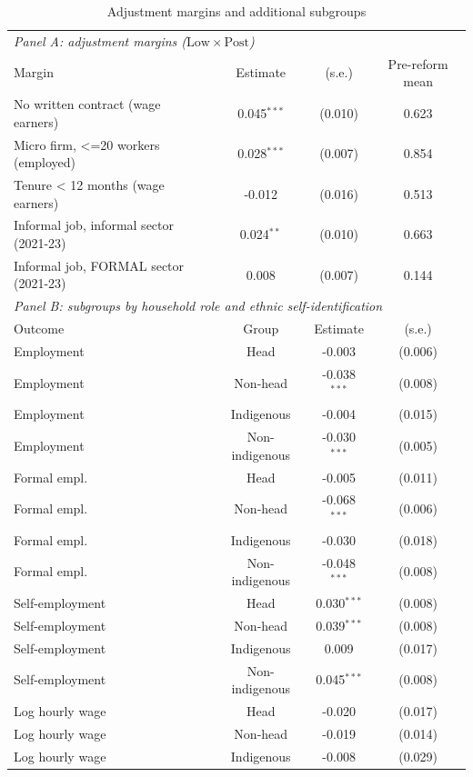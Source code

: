\begin{table}[!tbp]\centering
\caption{Adjustment margins and additional subgroups}\label{tab:margins}
\begin{threeparttable}
\footnotesize
\begin{tabular}{lccc}
\toprule
\multicolumn{4}{l}{\emph{Panel A: adjustment margins ($\mathrm{Low}\times\mathrm{Post}$)}}\\
Margin & Estimate & (s.e.) & Pre-reform mean \\
\midrule
No written contract (wage earners) & 0.045$^{***}$ & (0.010) & 0.623 \\
Micro firm, <=20 workers (employed) & 0.028$^{***}$ & (0.007) & 0.854 \\
Tenure < 12 months (wage earners) & -0.012 & (0.016) & 0.513 \\
Informal job, informal sector (2021-23) & 0.024$^{**}$ & (0.010) & 0.663 \\
Informal job, FORMAL sector (2021-23) & 0.008 & (0.007) & 0.144 \\
\midrule
\multicolumn{4}{l}{\emph{Panel B: subgroups by household role and ethnic self-identification}}\\
Outcome & Group & Estimate & (s.e.) \\ \midrule
Employment & Head & -0.003 & (0.006) \\
Employment & Non-head & -0.038$^{***}$ & (0.008) \\
Employment & Indigenous & -0.004 & (0.015) \\
Employment & Non-indigenous & -0.030$^{***}$ & (0.005) \\
Formal empl. & Head & -0.005 & (0.011) \\
Formal empl. & Non-head & -0.068$^{***}$ & (0.006) \\
Formal empl. & Indigenous & -0.030 & (0.018) \\
Formal empl. & Non-indigenous & -0.048$^{***}$ & (0.008) \\
Self-employment & Head & 0.030$^{***}$ & (0.008) \\
Self-employment & Non-head & 0.039$^{***}$ & (0.008) \\
Self-employment & Indigenous & 0.009 & (0.017) \\
Self-employment & Non-indigenous & 0.045$^{***}$ & (0.008) \\
Log hourly wage & Head & -0.020 & (0.017) \\
Log hourly wage & Non-head & -0.019 & (0.014) \\
Log hourly wage & Indigenous & -0.008 & (0.029) \\

\end{tabular}
\end{threeparttable}
\end{table}
